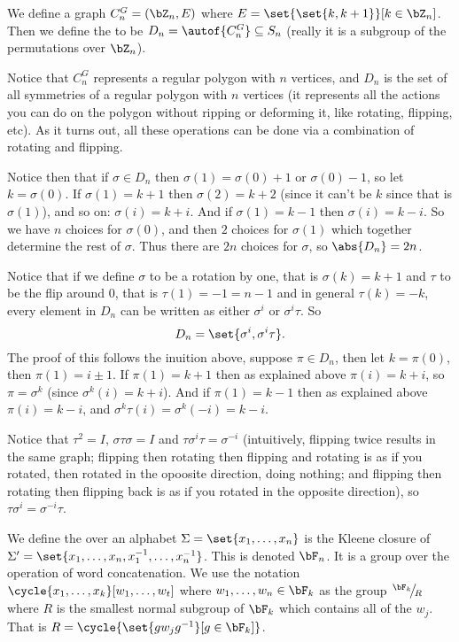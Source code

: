\documentclass[10pt]{article}
\def\slfrac#1#2{\left.{}^{#1}\mkern-4mu\middle/\mkern-3mu{}_{#2}\right.}
\begin{document}
\begin{exam}

    We define a graph $C^G_n=(\bZ_n,E)$ where $E=\set{\set{k,k+1}}[k\in\bZ_n]$.
    Then we define the  to be $D_n=\autof{C^G_n}\subseteq S_n$ (really it is a subgroup of the permutations over $\bZ_n$).

    Notice that $C_n^G$ represents a regular polygon with $n$ vertices, and $D_n$ is the set of all symmetries of a regular polygon with $n$ vertices (it represents all the actions you can do on the polygon
    without ripping or deforming it, like rotating, flipping, etc).
    As it turns out, all these operations can be done via a combination of rotating and flipping.

    Notice then that if $\sigma\in D_n$ then $\sigma(1)=\sigma(0)+1$ or $\sigma(0)-1$, so let $k=\sigma(0)$.
    If $\sigma(1)=k+1$ then $\sigma(2)=k+2$ (since it can't be $k$ since that is $\sigma(1)$), and so on: $\sigma(i)=k+i$.
    And if $\sigma(1)=k-1$ then $\sigma(i)=k-i$.
    So we have $n$ choices for $\sigma(0)$, and then $2$ choices for $\sigma(1)$ which together determine the rest of $\sigma$.
    Thus there are $2n$ choices for $\sigma$, so $\abs{D_n}=2n$.

    Notice that if we define $\sigma$ to be a rotation by one, that is $\sigma(k)=k+1$ and $\tau$ to be the flip around $0$, that is $\tau(1)=-1=n-1$ and in general $\tau(k)=-k$, every element in $D_n$ can
    be written as either $\sigma^i$ or $\sigma^i\tau$.
    So 
        \[ D_n=\set{\sigma^i,\sigma^i\tau} . \]
    The proof of this follows the inuition above, suppose $\pi\in D_n$, then let $k=\pi(0)$, then $\pi(1)=i\pm1$.
    If $\pi(1)=k+1$ then as explained above $\pi(i)=k+i$, so $\pi=\sigma^k$ (since $\sigma^k(i)=k+i$).
    And if $\pi(1)=k-1$ then as explained above $\pi(i)=k-i$, and $\sigma^k\tau(i)=\sigma^k(-i)=k-i$.

    Notice that $\tau^2=I$, $\sigma\tau\sigma=I$ and $\tau\sigma^i\tau=\sigma^{-i}$ (intuitively, flipping twice results in the same graph; flipping then rotating then flipping and rotating is as if you
    rotated, then rotated in the opoosite direction, doing nothing; and flipping then rotating then flipping back is as if you rotated in the opposite direction), so $\tau\sigma^i=\sigma^{-i}\tau$.

\end{exam}

\begin{defn*}

    We define the  over an alphabet $\Sigma=\set{x_1,\dots,x_n}$ is the Kleene closure of $\Sigma'=\set{x_1,\dots,x_n,x^{-1}_1,\dots,x_n^{-1}}$.
    This is denoted $\bF_n$.
    It is a group over the operation of word concatenation.
    We use the notation $\cycle{x_1,\dots,x_k}[w_1,\dots,w_t]$ where $w_1,\dots,w_n\in\bF_k$ as the group $\slfrac{\bF_k}R$ where $R$ is the smallest normal subgroup of $\bF_k$ which contains all of the
    $w_j$.
    That is $R=\cycle{\set{gw_jg^{-1}}[g\in\bF_k]}$.

\end{defn*}
\end{document}
